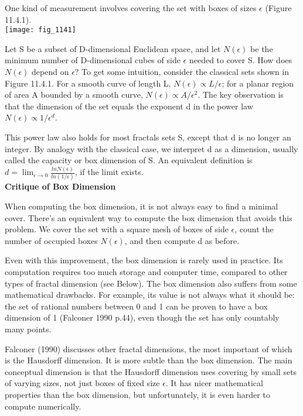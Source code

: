 \documentclass{article}
\newcommand\tab[1][1cm]{\hspace*{#1}}
\begin{document}
One kind of measurement involves covering the set with boxes of sizes $\epsilon$ (Figure 11.4.1). \\

\texttt{[image: fig\_1141]} 

Let S be a subset of D-dimensional Euclidean space, and let $N(\epsilon)$ be the minimum number of D-dimensional cubes of side $\epsilon$ needed to cover S. How does $N(\epsilon)$ depend on $\epsilon$? To get some intuition, consider the classical sets shown in Figure 11.4.1. For a smooth curve of length L, $N(\epsilon) \propto L/\epsilon$; for a planar region of area A bounded by a smooth curve, $N(\epsilon) \propto A/\epsilon^{2}$. The key observation is that the dimension of the set equals the exponent d in the power law $N(\epsilon) \propto 1/\epsilon^{d}$. \\ \tab

This power law also holds for most fractals sets S, except that d is no longer an integer. By analogy with the classical case, we interpret d as a dimension, usually called the capacity or box dimension of S. An equivalent definition is \\ \tab \tab
$ d = \lim_{\epsilon \to 0} \frac{ln N(\epsilon)}{ln (1/\epsilon)}$, if the limit exists. \\ 

\textbf {Critique of Box Dimension} \\ \tab

When computing the box dimension, it is not always easy to find a minimal cover. There's an equivalent way to compute the box dimension that avoids this problem. We cover the set with a square mesh of boxes of side $\epsilon$, count the number of occupied boxes $N(\epsilon)$, and then compute d as before. \\ \tab

Even with this improvement, the box dimension is rarely used in practice. Its computation requires too much storage and computer time, compared to other types of fractal dimension (see Below). The box dimension also suffers from some mathematical drawbacks. For example, its value is not always what it should be: the set of rational numbers between 0 and 1 can be proven to have a box dimension of 1 (Falconer 1990 p.44), even though the set has only countably many points. \\ \tab

Falconer (1990) discusses other fractal dimensions, the most important of which is the Hausdorff dimension. It is more subtle than the box dimension. The main conceptual dimension is that the Hausdorff dimension uses covering by small sets of varying sizes, not just boxes of fixed size $\epsilon$. It has nicer mathematical properties than the box dimension, but unfortunately, it is even harder to compute numerically. \\
\end{document}
